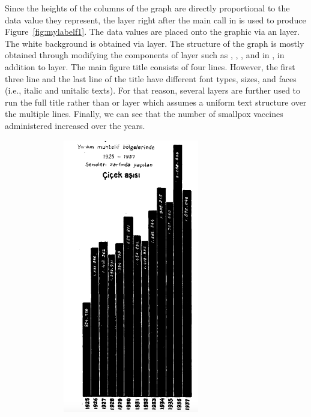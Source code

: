 Since the heights of the columns of the graph are directly proportional to the data value they represent,  the  layer right after the main  call in   is used to produce Figure~\ref{fig:mylabelf1}. The data values are placed onto the graphic via an  layer. The white background is obtained via  layer. 
The structure of the graph is mostly obtained  through modifying the components of  layer such as , , , and  in ,  in addition to  layer. The main figure title consists of four lines. However, the first three line and the last line of the title have different font types, sizes, and  faces (i.e., italic and unitalic texts).  For that reason, several  layers are further used to run the full title rather than  or  layer which assumes a uniform text structure over the multiple lines. Finally, we can see that the number of smallpox vaccines administered increased over the years.

\begin{figure}[ht!]
	\centering
	\includegraphics[width=9cm,height=12cm,keepaspectratio]{Cicek_original.png}
	\label{fig:mylabelf1org}
\end{figure}

